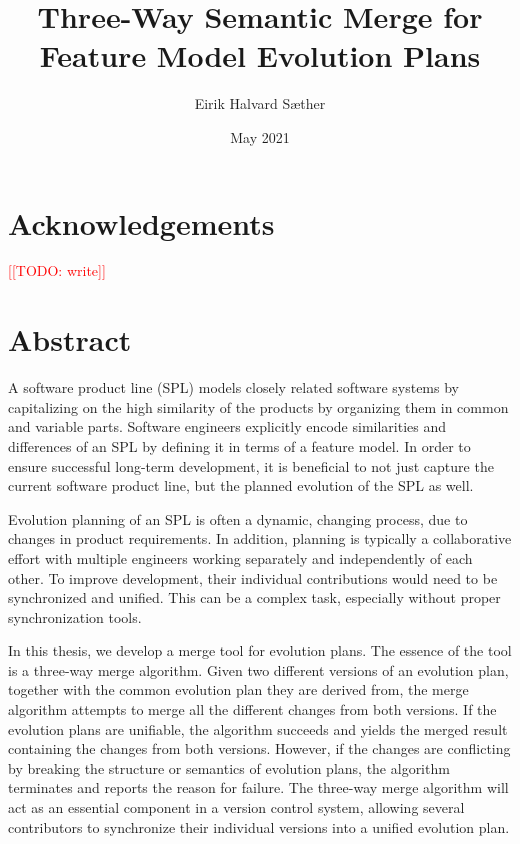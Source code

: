 \documentclass[a4paper,english]{ifimaster}
\title{Three-Way Semantic Merge for Feature Model Evolution Plans}
\date{May 2021}
\author{Eirik Halvard Sæther}
\newcommand{\todo}[1]{\textcolor{red}{[[TODO: #1]]}\PackageWarning{TODO:}{#1!}}
\begin{document}
\duoforside[dept={Department of Informatics},
program={Informatics: Programming and Systems Architecture},
long]
\frontmatter{}

\chapter*{Acknowledgements}

\todo{write}





\newpage
\thispagestyle{empty}
\mbox{}
\chapter*{Abstract}

A software product line (SPL) models closely related software systems by capitalizing on the high similarity of the products by organizing them in common and variable parts. Software engineers explicitly encode similarities and differences of an SPL by defining it in terms of a feature model. In order to ensure successful long-term development, it is beneficial to not just capture the current software product line, but the planned evolution of the SPL as well.

Evolution planning of an SPL is often a dynamic, changing process, due to changes in product requirements. In addition, planning is typically a collaborative effort with multiple engineers working separately and independently of each other. To improve development, their individual contributions would need to be synchronized and unified. This can be a complex task, especially without proper synchronization tools.

In this thesis, we develop a merge tool for evolution plans. The essence of the tool is a three-way merge algorithm. Given two different versions of an evolution plan, together with the common evolution plan they are derived from, the merge algorithm attempts to merge all the different changes from both versions. If the evolution plans are unifiable, the algorithm succeeds and yields the merged result containing the changes from both versions. However, if the changes are conflicting by breaking the structure or semantics of evolution plans, the algorithm terminates and reports the reason for failure. The three-way merge algorithm will act as an essential component in a version control system, allowing several contributors to synchronize their individual versions into a unified evolution plan.
\end{document}
